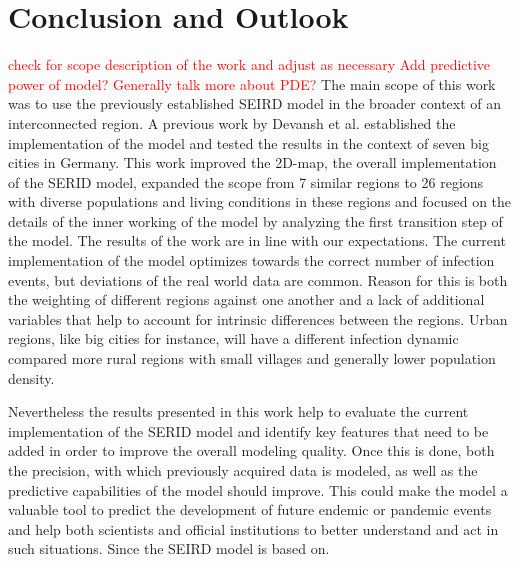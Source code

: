 

\section{Conclusion and Outlook}
\textcolor{red}{check for scope description of the work and adjust as necessary}
\textcolor{red}{Add predictive power of model?}
\textcolor{red}{Generally talk more about PDE?}
The main scope of this work was to use the previously established SEIRD model in the broader context of an interconnected region.
A previous work by Devansh et al.\cite{devansh} established the implementation of the model and tested the results in the
context of seven big cities in Germany. This work improved the 2D-map, the overall implementation of the SERID model, expanded
the scope from 7 similar regions to 26 regions with diverse populations and living conditions in these regions and focused on the
details of the inner working of the model by analyzing the first transition step of the model.
The results of the work are in line with our expectations. The current implementation
of the model optimizes towards the correct number of infection events, but deviations of the real world data are common. Reason for
this is both the weighting of different regions against one another and a lack of additional variables that help to account for
intrinsic differences between the regions. Urban regions, like big cities for instance, will have a different infection dynamic
compared more rural  regions with small villages and generally lower population density.\newline

Nevertheless the results presented in this work help to evaluate the current implementation of the SERID model and identify
key features that need to be added in order to improve the overall modeling quality. Once this is done, both the precision, with
which previously acquired data is modeled, as well as the predictive capabilities of the model should improve. This could make
the model a valuable tool to predict the development of future endemic or pandemic events and help both scientists and official
institutions to better understand and act in such situations. Since the SEIRD model is based on.  \newline 











